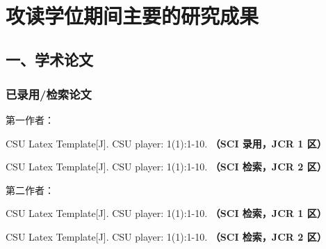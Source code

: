 
{~}
\vspace{18pt}
\section{攻读学位期间主要的研究成果} %

\ifblindreview
\fi
\vspace{11pt}
\subsection*{一、学术论文}

\ifblindreview



\subsubsection*{已录用/检索论文}
第一作者：
\begin{enumerate}[label={[\arabic*]},itemindent=2em,wide]
	\item CSU Latex Template[J]. CSU player: 1(1):1-10. {\bfseries \heiti（SCI 录用，JCR 1 区）}
	\item CSU Latex Template[J]. CSU player: 1(1):1-10. {\bfseries \heiti（SCI 检索，JCR 2 区）}
\end{enumerate}
第二作者：
\begin{enumerate}[label={[\arabic*]},itemindent=2em,wide]
	\item CSU Latex Template[J]. CSU player: 1(1):1-10. {\bfseries \heiti（SCI 检索，JCR 1 区）}
	\item CSU Latex Template[J]. CSU player: 1(1):1-10. {\bfseries \heiti（SCI 检索，JCR 2 区）}
\end{enumerate}
